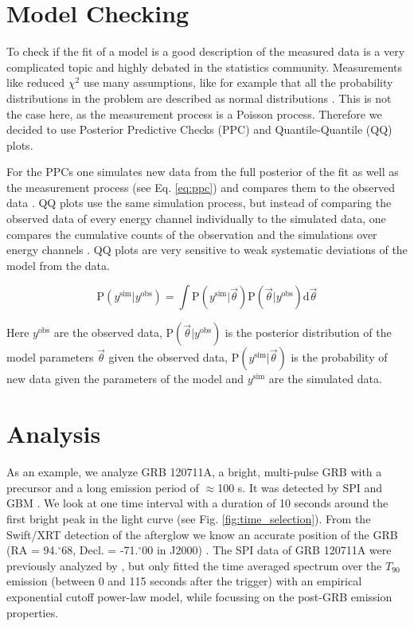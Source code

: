 \documentclass[twocolumn,traditabstract]{aa}
\def\fdg{\hbox{$.\!\!^\circ$}}          %
\begin{document}
\section{Model Checking}
\label{PPC}
To check if the fit of a model is a good description of the measured data is a very complicated topic and highly debated in the statistics community. Measurements like reduced $\chi^{2}$ use many assumptions, like for example that all the probability distributions in the problem are described as normal distributions \citep{dosanddonts}. This is not the case here, as the measurement process is a Poisson process. Therefore we decided to use Posterior Predictive Checks (PPC) and Quantile-Quantile (QQ) plots.

For the PPCs one simulates new data from the full posterior of the fit as well as the measurement process (see Eq. \ref{eq:ppc}) and compares them to the observed data \citep{ppc}. QQ plots use the same simulation process, but instead of comparing the observed data of every energy channel individually to the simulated data, one compares the cumulative counts of the observation and the simulations over energy channels  \citep{QQ}. QQ plots are very sensitive to weak systematic deviations of the model from the data.

\begin{equation}
  \textrm{P}(y^{\textrm{sim}}|y^{\textrm{obs}}) = \int \textrm{P}(y^{\textrm{sim}}|\vec{\theta}) \textrm{P}(\vec{\theta}|y^{\textrm{obs}}) \mathrm{d}\vec{\theta}
  \label{eq:ppc}
\end{equation}

\noindent
Here $y^{\textrm{obs}}$ are the observed data, $\textrm{P}(\vec{\theta}|y^{\textrm{obs}})$ is the posterior distribution of the model parameters $\vec{\theta}$ given the observed data, $\textrm{P}(y^{\textrm{sim}}|\vec{\theta})$ is the probability of new data given the parameters of the model and $y^{\textrm{sim}}$ are the simulated data.

\section{Analysis}
\label{analysis}
As an example, we analyze GRB 120711A, a bright, multi-pulse GRB with a precursor and a long emission period of $\approx$100 s. It was detected by SPI and GBM \citep{GCN_integral, GCN_gbm}.
We look at one time interval with a duration of 10 seconds around the first bright peak in the light curve (see Fig. \ref{fig:time_selection}). From the Swift/XRT detection of the afterglow we know an accurate position of the GRB (RA = 94\fdg68, Decl. = -71\fdg00 in J2000) \citep{GCN_swift}. The SPI data of GRB 120711A were previously analyzed by \citet{Martin-Carrillo-2014}, but only fitted the time averaged spectrum over the $T_{90}$ emission (between 0 and 115 seconds after the trigger) with an empirical exponential cutoff power-law model, while focussing on the post-GRB emission properties.
\end{document}
